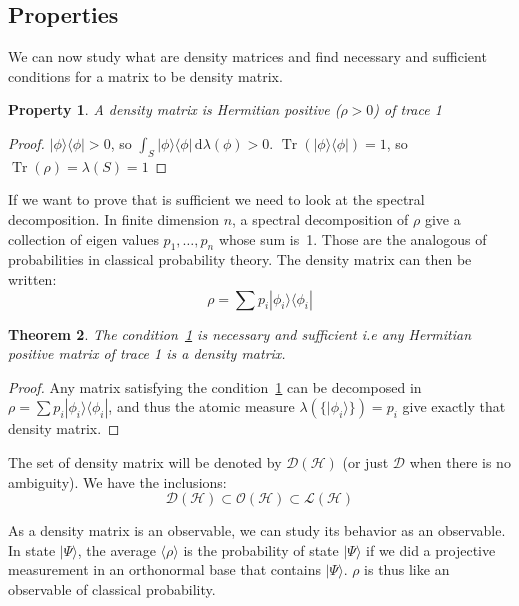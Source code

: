\documentclass[10pt]{report}
\theoremstyle{plain}
\newtheorem{thm}{Theorem}[chapter]
\newtheorem{prop}[thm]{Property}
\theoremstyle{definition}
\theoremstyle{remark}
\newcommand{\ket}[1]{|#1\rangle}
\newcommand{\bra}[1]{\langle#1|}
\newcommand{\dd}{\mathrm{d}}
\DeclareMathOperator{\Tr}{Tr}
\begin{document}
\subsection{Properties}

We can now study what are density matrices and find necessary and sufficient
conditions for a matrix to be density matrix.

\begin{prop}\label{prop:dens}
  A density matrix is Hermitian positive ($\rho > 0$) of trace 1
\end{prop}

\begin{proof}
  $\ket \phi \bra \phi > 0$, so $ \int_S \ket \phi \bra \phi \,\dd\lambda(\phi)
  > 0$.
  $\Tr(\ket \phi \bra \phi) = 1$, so $\Tr(\rho) = \lambda(S) = 1$
\end{proof}

If we want to prove that is sufficient we need to look at the spectral
decomposition.
In finite dimension $n$, a spectral decomposition of $\rho$ give a
collection of eigen values $p_1, \ldots, p_n$ whose sum is~1. Those are the
analogous of probabilities in classical probability theory. The density matrix
can then be written:
\[\rho = \sum p_i \ket {\phi_i} \bra {\phi_i}\]

\begin{thm} The condition~\ref{prop:dens} is necessary and sufficient i.e any Hermitian positive matrix of trace 1 is a density matrix.
\end{thm}

\begin{proof}
  Any matrix satisfying the condition~\ref{prop:dens} can be decomposed in
  $\rho = \sum p_i \ket {\phi_i} \bra {\phi_i}$, and thus the atomic measure
  $\lambda(\{\ket {\phi_i}\}) = p_i$ give exactly that density matrix.
\end{proof}

The set of density matrix will be denoted by $\mathcal{D}(\mathcal{H})$ (or just
$\mathcal{D}$ when there is no ambiguity). We have the inclusions:
\[\mathcal{D}(\mathcal{H}) \subset \mathcal{O}(\mathcal{H}) \subset \mathcal{L}(\mathcal{H})\]

As a density matrix is an observable, we can study its behavior as an observable.
In state $\ket \Psi$, the average $\langle \rho \rangle$ is the probability of
state $\ket \Psi$ if we did a projective measurement in an orthonormal base that
contains $\ket \Psi$. $\rho$ is thus like an observable of classical probability.
\end{document}
